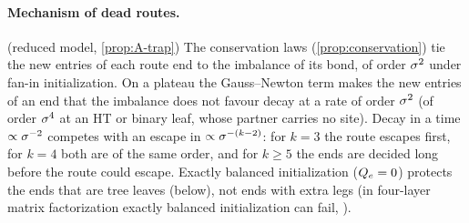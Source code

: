 \paragraph{Mechanism of dead routes.}
\derived{} (reduced model, \cref{prop:A-trap}) The conservation laws (\cref{prop:conservation}) tie the new
entries of each route end to the imbalance of its bond, of order $\sigma^2$ under fan-in initialization. On a plateau
the Gauss--Newton term makes the new entries of an end that the imbalance does not favour decay at a rate of order
$\sigma^2$ (of order $\sigma^4$ at an HT or binary leaf, whose partner carries no site). Decay in a time
$\propto\sigma^{-2}$ competes with an escape in $\propto\sigma^{-(k-2)}$: for $k=3$ the route escapes first, for $k=4$ both
are of the same order, and for $k\ge5$ the ends are decided long before the route could escape. Exactly balanced
initialization ($Q_{e}=0$) protects the ends that are tree leaves (below), not ends with extra legs (in four-layer
matrix factorization exactly balanced initialization can fail, \citealp{luo2025global}).

